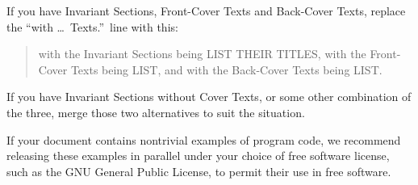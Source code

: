 If you have Invariant Sections, Front-Cover Texts and Back-Cover Texts,
replace the ``with \dots\ Texts.''\ line with this:

\bigskip
\begin{quote}
    with the Invariant Sections being LIST THEIR TITLES, with the
    Front-Cover Texts being LIST, and with the Back-Cover Texts being LIST.
\end{quote}
\bigskip
    
If you have Invariant Sections without Cover Texts, or some other
combination of the three, merge those two alternatives to suit the
situation.

If your document contains nontrivial examples of program code, we
recommend releasing these examples in parallel under your choice of
free software license, such as the GNU General Public License,
to permit their use in free software.

%
